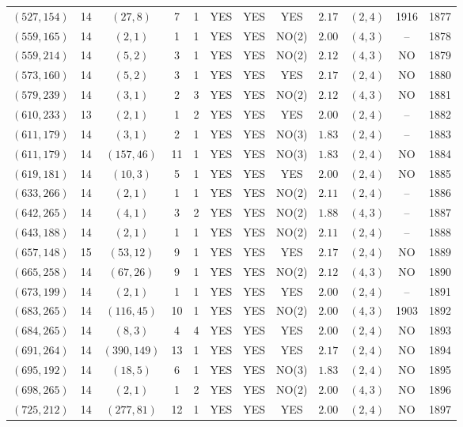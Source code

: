 \begin{longtable}{|c|c|c|c|c|c|c|c|c|c|c|c|}
$(527,154)$ & 14 & $(27,8)$ & 7 & 1 & YES & YES & YES & $2.17$ & $(2,4)$ & 1916 & 1877\\
$(559,165)$ & 14 & $(2,1)$ & 1 & 1 & YES & YES & NO(2) & $2.00$ & $(4,3)$ & -- & 1878\\
$(559,214)$ & 14 & $(5,2)$ & 3 & 1 & YES & YES & NO(2) & $2.12$ & $(4,3)$ & NO & 1879\\
$(573,160)$ & 14 & $(5,2)$ & 3 & 1 & YES & YES & YES & $2.17$ & $(2,4)$ & NO & 1880\\
$(579,239)$ & 14 & $(3,1)$ & 2 & 3 & YES & YES & NO(2) & $2.12$ & $(4,3)$ & NO & 1881\\
$(610,233)$ & 13 & $(2,1)$ & 1 & 2 & YES & YES & YES & $2.00$ & $(2,4)$ & -- & 1882\\
$(611,179)$ & 14 & $(3,1)$ & 2 & 1 & YES & YES & NO(3) & $1.83$ & $(2,4)$ & -- & 1883\\
$(611,179)$ & 14 & $(157,46)$ & 11 & 1 & YES & YES & NO(3) & $1.83$ & $(2,4)$ & NO & 1884\\
$(619,181)$ & 14 & $(10,3)$ & 5 & 1 & YES & YES & YES & $2.00$ & $(2,4)$ & NO & 1885\\
$(633,266)$ & 14 & $(2,1)$ & 1 & 1 & YES & YES & NO(2) & $2.11$ & $(2,4)$ & -- & 1886\\
$(642,265)$ & 14 & $(4,1)$ & 3 & 2 & YES & YES & NO(2) & $1.88$ & $(4,3)$ & -- & 1887\\
$(643,188)$ & 14 & $(2,1)$ & 1 & 1 & YES & YES & NO(2) & $2.11$ & $(2,4)$ & -- & 1888\\
$(657,148)$ & 15 & $(53,12)$ & 9 & 1 & YES & YES & YES & $2.17$ & $(2,4)$ & NO & 1889\\
$(665,258)$ & 14 & $(67,26)$ & 9 & 1 & YES & YES & NO(2) & $2.12$ & $(4,3)$ & NO & 1890\\
$(673,199)$ & 14 & $(2,1)$ & 1 & 1 & YES & YES & YES & $2.00$ & $(2,4)$ & -- & 1891\\
$(683,265)$ & 14 & $(116,45)$ & 10 & 1 & YES & YES & NO(2) & $2.00$ & $(4,3)$ & 1903 & 1892\\
$(684,265)$ & 14 & $(8,3)$ & 4 & 4 & YES & YES & YES & $2.00$ & $(2,4)$ & NO & 1893\\
$(691,264)$ & 14 & $(390,149)$ & 13 & 1 & YES & YES & YES & $2.17$ & $(2,4)$ & NO & 1894\\
$(695,192)$ & 14 & $(18,5)$ & 6 & 1 & YES & YES & NO(3) & $1.83$ & $(2,4)$ & NO & 1895\\
$(698,265)$ & 14 & $(2,1)$ & 1 & 2 & YES & YES & NO(2) & $2.00$ & $(4,3)$ & NO & 1896\\
$(725,212)$ & 14 & $(277,81)$ & 12 & 1 & YES & YES & YES & $2.00$ & $(2,4)$ & NO & 1897\\

\end{longtable}
